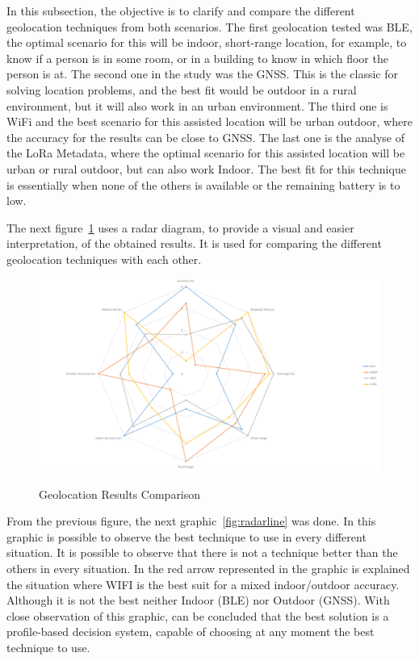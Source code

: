 In this subsection, the objective is to clarify and compare the different geolocation techniques from both scenarios. The first geolocation tested was BLE, the optimal scenario for this will be indoor, short-range location, for example, to know if a person is in some room, or in a building to know in which floor the person is at. The second one in the study was the GNSS. This is the classic for solving location problems, and the best fit would be outdoor in a rural environment, but it will also work in an urban environment. The third one is WiFi and the best scenario for this assisted location will be urban outdoor, where the accuracy for the results can be close to GNSS. The last one is the analyse of the LoRa Metadata, where the optimal scenario for this assisted location will be urban or rural outdoor, but can also work Indoor. The best fit for this technique is essentially when none of the others is available or the remaining battery is to low.

The next figure~\ref{fig:radar1} uses a radar diagram, to provide a visual and easier interpretation, of the obtained results. It is used for  comparing the different geolocation techniques with each other.
\begin{figure}[htbp]
  \centering
  
    {\includegraphics[width=0.8\linewidth]{Chapters/Figures/radarfinal3.pdf}}%
 
  \caption{Geolocation Results Comparison}
  \label{fig:radar1}
\end{figure}

From the previous figure, the next graphic~\ref{fig:radarline} was done. In this graphic is possible to observe the best technique to use in every different situation. It is possible to observe that there is not a technique better than the others in every situation. In the red arrow represented in the graphic is explained the situation where WIFI is the best suit for a mixed indoor/outdoor accuracy. Although it is not the best neither Indoor (BLE) nor Outdoor (GNSS). With   close observation of this graphic, can be concluded that the best solution is a profile-based decision system, capable of choosing at any moment the best technique to use.

